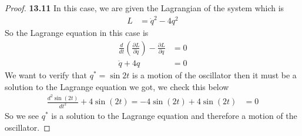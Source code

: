 \documentclass[11pt]{article}
\theoremstyle{definition}
\begin{document}
\begin{proof}{\textbf{13.11}}
    In this case, we are given the Lagrangian of the system which is
    \begin{align*}
        L &= \dot{q}^2 - 4q^2
    \end{align*}
    So the Lagrange equation in this case is
    \begin{align*}
        \frac{d}{dt}\left(\frac{\partial L}{\partial \dot q}\right)
        - \frac{\partial L}{\partial q} &= 0\\
        \ddot{q} + 4q &= 0
    \end{align*}
    We want to verify that $q^* = \sin 2t$ is a motion of the oscillator then
    it must be a solution to the Lagrange equation we got, we check this below
    \begin{align*}
        \frac{d^2\sin(2t)}{dt^2} + 4\sin(2t) = -4\sin(2t) + 4\sin (2t) &= 0
    \end{align*}
    So we see $q^*$ is a solution to the Lagrange equation and therefore
    a motion of the oscillator.


\end{proof}
\end{document}
